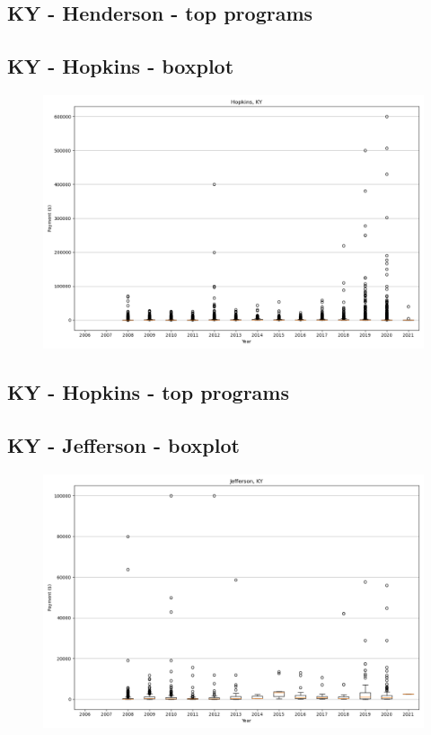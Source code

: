 \subsection*{KY - Henderson - top programs}

\newpage
\subsection*{KY - Hopkins - boxplot}
\begin{figure}[h]
\centering
\includegraphics[width=7in]{../output/boxplots/counties/Hopkins-KY_boxplot.png}
\end{figure}


\subsection*{KY - Hopkins - top programs}

\newpage
\subsection*{KY - Jefferson - boxplot}
\begin{figure}[h]
\centering
\includegraphics[width=7in]{../output/boxplots/counties/Jefferson-KY_boxplot.png}
\end{figure}


